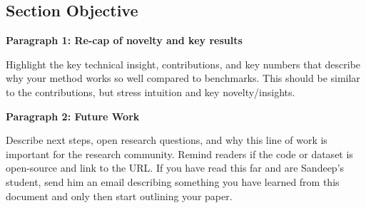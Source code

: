 \subsection{Section Objective}

\textbf{Paragraph 1: Re-cap of novelty and key results}

Highlight the key technical insight, contributions, and key numbers that describe why your method works so well compared to benchmarks. This should be similar to the contributions, but stress intuition and key novelty/insights. 

\textbf{Paragraph 2: Future Work}

Describe next steps, open research questions, and why this line of work is important for the research community. Remind readers if the code or dataset is open-source and link to the URL. If you have read this far and are Sandeep's student, send him an email describing something you have learned from this document and only then start outlining your paper. 

